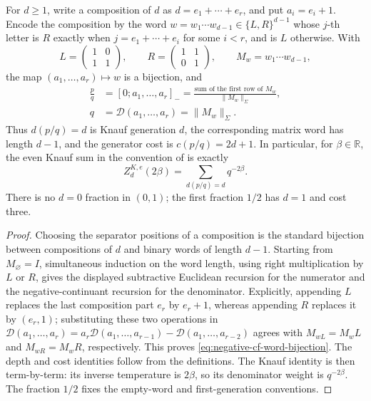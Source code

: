 \begin{lemma}
\label{lem:continued-fraction-knauf-normalization}
For \(d\ge1\), write a composition of \(d\) as
\(d=e_1+\cdots+e_r\), and put \(a_i=e_i+1\).  Encode the composition by the
word \(w=w_1\cdots w_{d-1}\in\{L,R\}^{d-1}\) whose \(j\)-th letter is \(R\)
exactly when \(j=e_1+\cdots+e_i\) for some \(i<r\), and is \(L\) otherwise.
With
\[
 L=\begin{pmatrix}1&0\\1&1\end{pmatrix},\qquad
 R=\begin{pmatrix}1&1\\0&1\end{pmatrix},\qquad M_w=w_1\cdots w_{d-1},
\]
the map \((a_1,\ldots,a_r)\mapsto w\) is a bijection, and
\begin{equation}
 \begin{aligned}
 \frac pq&=[0;a_1,\ldots,a_r]_-=
 \frac{\text{sum of the first row of }M_w}{\|M_w\|_\Sigma},\\
 q&=\mathcal D(a_1,\ldots,a_r)=\|M_w\|_\Sigma.
 \end{aligned}
 \label{eq:negative-cf-word-bijection}
\end{equation}
Thus \(d(p/q)=d\) is Knauf generation \(d\), the corresponding matrix word
has length \(d-1\), and the generator cost is \(c(p/q)=2d+1\).  In particular,
for \(\beta\in\mathbb R\), the even Knauf sum in the convention of
\cite[Sec.~IV]{FialaKlebanOzluk2003} is exactly
\[
 Z^{K,e}_d(2\beta)
 =\sum_{d(p/q)=d}q^{-2\beta}.
\]
There is no \(d=0\) fraction in \((0,1)\); the first fraction \(1/2\) has
\(d=1\) and cost three.
\end{lemma}

\begin{proof}
Choosing the separator positions of a composition is the standard bijection
between compositions of \(d\) and binary words of length \(d-1\).  Starting
from \(M_\varnothing=I\), simultaneous induction on the word length, using
right multiplication by \(L\) or \(R\), gives the displayed subtractive
Euclidean recursion for the numerator and the negative-continuant recursion
for the denominator.  Explicitly, appending \(L\) replaces the last
composition part \(e_r\) by \(e_r+1\), whereas appending \(R\) replaces it by
\((e_r,1)\); substituting these two operations in
\(\mathcal D(a_1,\ldots,a_r)
=a_r\mathcal D(a_1,\ldots,a_{r-1})
-\mathcal D(a_1,\ldots,a_{r-2})\) agrees with
\(M_{wL}=M_wL\) and \(M_{wR}=M_wR\), respectively.  This proves
\eqref{eq:negative-cf-word-bijection}.
The depth and cost identities follow from the definitions.  The Knauf
identity is then term-by-term: its inverse temperature is \(2\beta\), so its
denominator weight is \(q^{-2\beta}\).  The fraction \(1/2\) fixes the
empty-word and first-generation conventions.
\end{proof}

